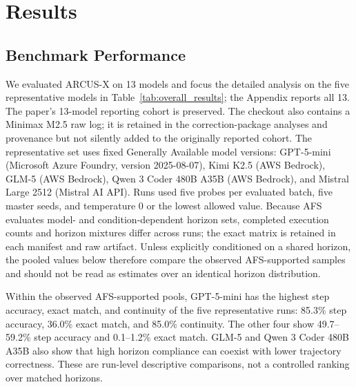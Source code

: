 \documentclass{article}
\begin{document}
\section{Results}

\subsection{Benchmark Performance}
We evaluated ARCUS-X on 13 models and focus the detailed analysis on the five representative models in Table~\ref{tab:overall_results}; the Appendix reports all 13. The paper's 13-model reporting cohort is preserved. The checkout also contains a Minimax M2.5 raw log; it is retained in the correction-package analyses and provenance but not silently added to the originally reported cohort. The representative set uses fixed Generally Available model versions: GPT-5-mini (Microsoft Azure Foundry, version 2025-08-07), Kimi K2.5 (AWS Bedrock), GLM-5 (AWS Bedrock), Qwen 3 Coder 480B A35B (AWS Bedrock), and Mistral Large 2512 (Mistral AI API). Runs used five probes per evaluated batch, five master seeds, and temperature 0 or the lowest allowed value. Because AFS evaluates model- and condition-dependent horizon sets, completed execution counts and horizon mixtures differ across runs; the exact matrix is retained in each manifest and raw artifact. Unless explicitly conditioned on a shared horizon, the pooled values below therefore compare the observed AFS-supported samples and should not be read as estimates over an identical horizon distribution.
\begin{table}[!ht]
\centering
\caption{Overall ARCUS-X trajectory-level performance over all recorded non-calibration probes. Asterisks indicate response validity below 75\%. Validity denotes the proportion of probes yielding cognitively analyzable responses.}
\label{tab:overall_results}
\scriptsize
{}
\end{table}
Within the observed AFS-supported pools, GPT-5-mini has the highest step accuracy, exact match, and continuity of the five representative runs: 85.3\% step accuracy, 36.0\% exact match, and 85.0\% continuity. The other four show 49.7--59.2\% step accuracy and 0.1--1.2\% exact match. GLM-5 and Qwen 3 Coder 480B A35B also show that high horizon compliance can coexist with lower trajectory correctness. These are run-level descriptive comparisons, not a controlled ranking over matched horizons.
\end{document}
